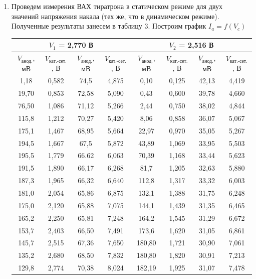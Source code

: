 \documentclass[a4paper, 12pt]{article}%
\begin{document}
\begin{enumerate}
	\item Проведем измерения ВАХ тиратрона в статическом режиме для двух значений напряжения накала (тех же, что в динамическом режиме).
	Полученные результаты занесем в таблицу 3. Построим график $ I_a = f(V_c) $
	
	\begin{longtable}{|c|c|c|c|c|c|c|c|}
		\hline
		\multicolumn{4}{|c|}{$V_1$ = 2,770 В} & \multicolumn{4}{c|}{$V_2$ = 2,516 В} \\ \hline
		$V_\text{анод.}$, мВ & $V_\text{кат.-сет.}$, В &  $V_\text{анод.}$, мВ & $V_\text{кат.-сет.}$, В  & $V_\text{анод.}$, мВ & $V_\text{кат.-сет.}$, В  &  $V_\text{анод.}$, мВ & $V_\text{кат.-сет.}$, В  \\ \hline
		
		1,18  & 0,582 & 74,5  & 4,875 & 0,10   & 0,125 & 42,13 & 4,419 \\ \hline
		19,70 & 0,853 & 72,58 & 5,090 & 0,43   & 0,600 & 39,78 & 4,660 \\ \hline
		76,50 & 1,086 & 71,12 & 5,266 & 2,44   & 0,750 & 38,02 & 4,844 \\ \hline
		115,8 & 1,212 & 70,27 & 5,420 & 8,06   & 0,858 & 36,07 & 5,067 \\ \hline
		175,1 & 1,467 & 68,95 & 5,664 & 22,97  & 0,970 & 35,05 & 5,267 \\ \hline
		194,5 & 1,667 & 67,5  & 5,872 & 43,89  & 1,069 & 33,95 & 5,503 \\ \hline
		195,5 & 1,779 & 66.62 & 6,063 & 70,39  & 1,168 & 33,44 & 5,623 \\ \hline
		191,5 & 1,890 & 66,17 & 6,268 & 81,7   & 1,205 & 32,63 & 5,880 \\ \hline
		187,3 & 1,965 & 66,32 & 6,640 & 112,8  & 1,317 & 33,32 & 6,003 \\ \hline
		181,0 & 2,054 & 65,86 & 6,875 & 132,1  & 1,388 & 31,75 & 6,248 \\ \hline
		175,0 & 2,120 & 65,88 & 7,075 & 144,1  & 1,439 & 31,35 & 6,465 \\ \hline
		165,2 & 2,250 & 65,81 & 7,248 & 164,2  & 1,545 & 31,29 & 6,672 \\ \hline
		153,7 & 2,403 & 66,50 & 7,491 & 173,6  & 1,620 & 31,05 & 6,861 \\ \hline
		145,7 & 2,515 & 67,36 & 7,650 & 180,80 & 1,721 & 30,90 & 7,061 \\ \hline
		135,2 & 2,680 & 68,50 & 7,832 & 180,80 & 1,820 & 30,91 & 7,213 \\ \hline
		129,8 & 2,774 & 70,38 & 8,024 & 182,19 & 1,925 & 31,07 & 7,478 \\ \hline

\end{longtable}
\end{enumerate}
\end{document}
